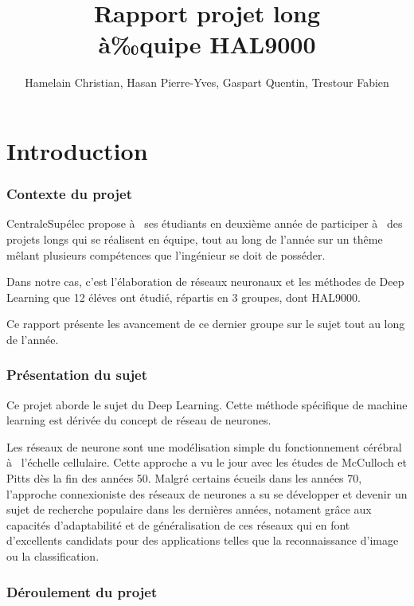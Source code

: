 \documentclass[a4paper,twoside]{report}
\title{Rapport projet long\\à‰quipe HAL9000}
\author{Hamelain Christian, Hasan Pierre-Yves, Gaspart Quentin, Trestour Fabien}
\begin{document}
\maketitle


\tableofcontents


\part{Introduction}

\section[Contexte]{Contexte du projet}

CentraleSupélec propose à  ses étudiants en deuxième année de participer
à  des projets longs qui se réalisent en équipe, tout au long de l'année sur un thême mêlant plusieurs compétences que l'ingénieur se doit de posséder.

Dans notre cas, c'est l'élaboration de réseaux neuronaux et les méthodes de Deep Learning que 12 éléves ont étudié, répartis en 3 groupes, dont HAL9000.

Ce rapport présente les avancement de ce dernier groupe sur le sujet tout au long de l'année.


\section{Présentation du sujet}

Ce projet aborde le sujet du Deep Learning. Cette méthode spécifique de machine learning est dérivée du concept de réseau de neurones.

Les réseaux de neurone sont une modélisation simple du fonctionnement cérébral
à  l'échelle cellulaire. Cette approche a vu le jour avec les études de McCulloch et Pitts dès la fin des années 50. Malgré certains écueils dans les années 70, l'approche connexioniste des réseaux de neurones a su se développer et devenir un sujet de recherche populaire dans les dernières années, notament grâce aux capacités d'adaptabilité et de généralisation de ces réseaux qui en font d'excellents candidats pour des applications telles que la reconnaissance d'image ou la classification.


\section[Déroulement]{Déroulement du projet}
\end{document}
